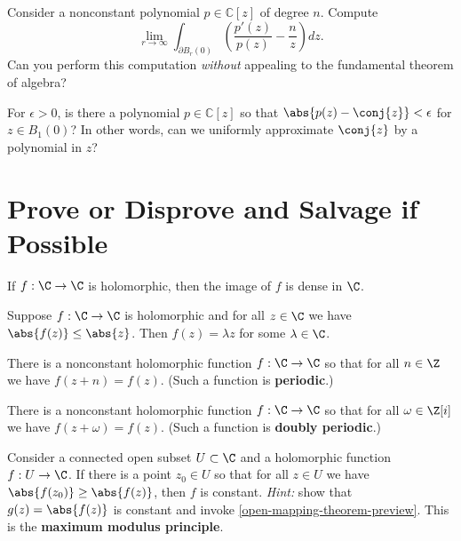 \documentclass{homework}
\begin{document}
\begin{problem}\label{argument-principle-polynomial}Consider a nonconstant polynomial $p \in \mathbb{C}[z]$ of degree $n$.  Compute
  \[
    \lim_{r \to \infty} \int_{\partial B_r(0)} \left( \frac{p'(z)}{p(z)} - \frac{n}{z} \right) dz.
  \]
  Can you perform this computation \textit{without} appealing to the
  fundamental theorem of algebra?
\end{problem}

\begin{problem}\label{uniformly-approximate-conj}For $\epsilon > 0$, is there a polynomial $p \in \mathbb{C}[z]$ so
  that $\abs{p(z) - \conj{z}} < \epsilon$ for $z \in B_1(0)$?  In
  other words, can we uniformly approximate $\conj{z}$ by a polynomial
  in $z$?
\end{problem}

\section{Prove or Disprove and Salvage if Possible}

\begin{problem}\label{entire-is-dense}If $f : \C \to \C$ is
  holomorphic, then the image of $f$ is dense in $\C$.
\end{problem}

\begin{problem}\label{identity-dominate-entire}Suppose $f : \C \to \C$
  is holomorphic and for all $z \in \C$ we have
  $\abs{f(z)} \leq \abs{z}$.  Then $f(z) = \lambda z$ for some
  $\lambda \in \C$.
\end{problem}

\begin{problem}
  There is a nonconstant holomorphic function $f : \C \to \C$ so that
  for all $n \in \Z$ we have $f(z + n) = f(z)$.  (Such a function is
  \textbf{periodic}.)
\end{problem}

\begin{problem}\label{doubly-periodic}There is a nonconstant holomorphic function $f : \C \to \C$ so that
  for all $\omega \in \Z[i]$ we have $f(z + \omega) = f(z)$.  (Such a
  function is \textbf{doubly periodic}.)
\end{problem}

\begin{problem}\label{maximum-modulus-principle}Consider a connected open subset $U \subset \C$ and a holomorphic
  function $f : U \to \C$.  If there is a point $z_0 \in U$ so that
  for all $z \in U$ we have $\abs{f(z_0)} \geq \abs{f(z)}$, then $f$
  is constant.  \textit{Hint:} show that $g(z) = \abs{f(z)}$ is
  constant and invoke \ref{open-mapping-theorem-preview}.  This is the
  \textbf{maximum modulus principle}.
\end{problem}
\end{document}
